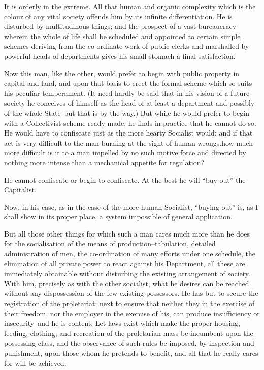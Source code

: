 \documentclass{book}
\begin{document}
It is orderly in the extreme. All that human and organic complexity which is the colour of any vital society offends him by its infinite differentiation. He is disturbed by multitudinous things; and the prospect of a vast bureaucracy wherein the whole of life shall be scheduled and appointed to certain simple schemes deriving from the co-ordinate work of public clerks and marshalled by powerful heads of departments gives his small stomach a final satisfaction.

Now this man, like the other, would prefer to begin with public property in capital and land, and upon that basis to erect the formal scheme which so suits his peculiar temperament. (It need hardly be said that in his vision of a future society he conceives of himself as the head of at least a department and possibly of the whole State–but that is by the way.) But while he would prefer to begin with a Collectivist scheme ready-made, he finds in practice that he cannot do so. He would have to confiscate just as the more hearty Socialist would; and if that act is very difficult to the man burning at the sight of human wrongs.how much more difficult is it to a man impelled by no such motive force and directed by nothing more intense than a mechanical appetite for regulation?

He cannot confiscate or begin to confiscate. At the best he will “buy out” the Capitalist.

Now, in his case, as in the case of the more human Socialist, “buying out” is, as I shall show in its proper place, a system impossible of general application.

But all those other things for which such a man cares much more than he does for the socialisation of the means of production–tabulation, detailed administration of men, the co-ordination of many efforts under one schedule, the elimination of all private power to react against his Department, all these are immediately obtainable without disturbing the existing arrangement of society. With him, precisely as with the other socialist, what he desires can be reached without any dispossession of the few existing possessors. He has but to secure the registration of the proletariat; next to ensure that neither they in the exercise of their freedom, nor the employer in the exercise of his, can produce insufficiency or insecurity–and he is content. Let laws exist which make the proper housing, feeding, clothing, and recreation of the proletarian mass be incumbent upon the possessing class, and the observance of such rules be imposed, by inspection and punishment, upon those whom he pretends to benefit, and all that he really cares for will be achieved.
\end{document}
